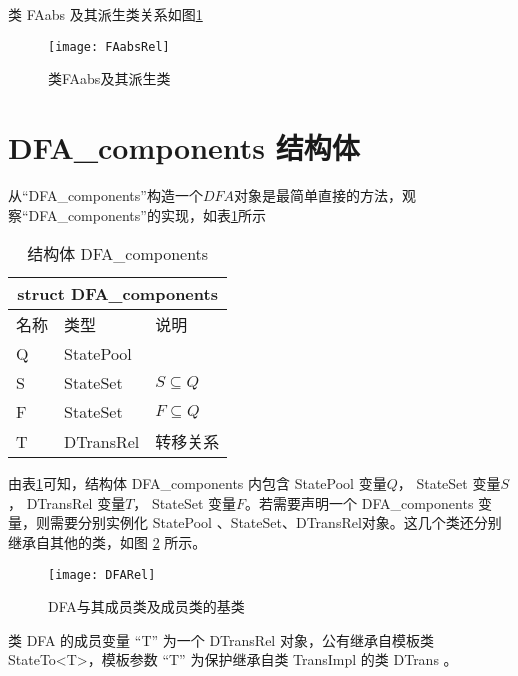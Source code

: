 类 FAabs 及其派生类关系如图\ref{fig:FAabsRel}

\begin{figure}[!htbp]
    \centering
    \texttt{[image: FAabsRel]}
    \caption{类FAabs及其派生类}
    \label{fig:FAabsRel}
\end{figure}

\section{DFA\_components 结构体}\label{sc:dfa_com}%

从“DFA\_components”构造一个$DFA$对象是最简单直接的方法，观察“DFA\_components”的实现，如表\ref{tab:DFA-components}所示
\begin{table}[!htbp]
    \caption{结构体 DFA\_components}
    \label{tab:DFA-components}
    \centering
    \small%
    \setlength{\tabcolsep}{4pt}%
    \renewcommand{\arraystretch}{1.2}%
        \begin{tabular}{p{3em}<{\centering} p{5em}<{\raggedright} p{5em}<{\raggedright}} %
        \toprule 
         \multicolumn{3}{c}{struct DFA\_components} \\
        \midrule
        名称& 类型 & \mbox{说明} \\
        \midrule
        Q & StatePool &           \\
        S & StateSet  &  $S\subseteq Q$ \\
        F & StateSet  &  $F\subseteq Q$ \\
        T & DTransRel &  转移关系  \\
        \bottomrule
    \end{tabular}
\end{table}
由表\ref{tab:DFA-components}可知，结构体 DFA\_components 内包含 StatePool 变量$Q$， StateSet 变量$S$， DTransRel 变量$T$， StateSet 变量$F$。若需要声明一个 DFA\_components 变量，则需要分别实例化 StatePool 、StateSet、DTransRel对象。这几个类还分别继承自其他的类，如图 \ref{fig:DFARel} 所示。

\begin{figure}[!htbp]
    \centering
    \texttt{[image: DFARel]}
    \caption{DFA与其成员类及成员类的基类}
    \label{fig:DFARel}
\end{figure}

类 DFA 的成员变量 “T” 为一个 DTransRel 对象，公有继承自模板类 StateTo<T>，模板参数 “T” 为保护继承自类 TransImpl 的类 DTrans 。

